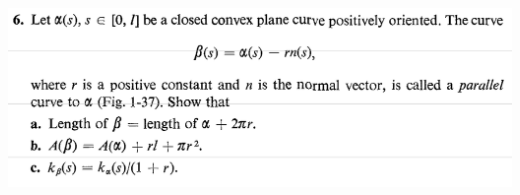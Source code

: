 \documentclass{report}
\begin{document}
\begin{question}{}{}
\includegraphics[height=8cm,width=18cm]{hw2q13}
\end{question}
\end{document}
